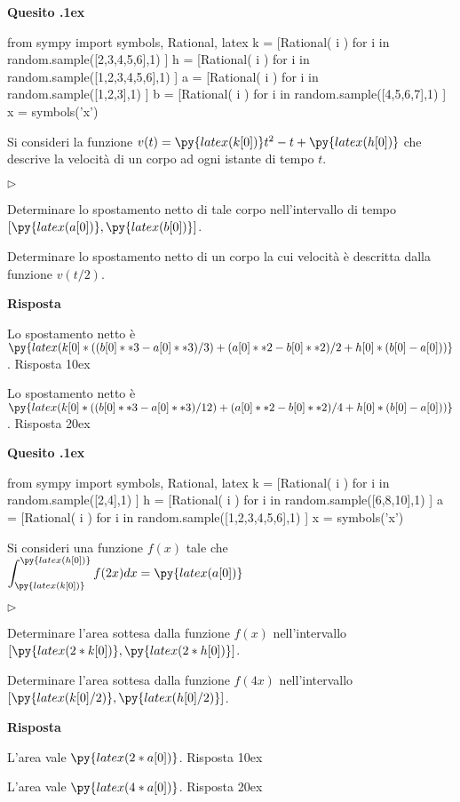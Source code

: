 \documentclass[11pt,twoside,a4paper]{article}
\newcommand{\mylabel}[1]{#1\hfill}
\renewenvironment{itemize}
  {\begin{list}{$\triangleright$}{%
   \setlength{\parskip}{0mm}
   \setlength{\topsep}{.4\baselineskip}
   \setlength{\rightmargin}{0mm}
   \setlength{\listparindent}{0mm}
   \setlength{\itemindent}{0mm}
   \setlength{\labelwidth}{2ex}
   \setlength{\itemsep}{.4\baselineskip}
   \setlength{\parsep}{0mm}
   \setlength{\partopsep}{0mm}
   \setlength{\labelsep}{1ex}
   \setlength{\leftmargin}{\labelwidth+\labelsep}
   \let\makelabel\mylabel}}{%
   \end{list}\vspace*{-1.3mm}}
\newcounter{quesito}
\newenvironment{question}{\bigskip\addtocounter{quesito}{1}\bigskip\bigskip\par\textbf{Quesito \thequesito.\kern1ex}}{\vspace{\parskip}}
\newenvironment{answer}{\par\textbf{Risposta\quad}}{\vspace{\parskip}}
\begin{document}
\begin{question}
\begin{pycode}
from sympy import symbols, Rational, latex
k = [Rational( i ) for i in random.sample([2,3,4,5,6],1) ]
h = [Rational( i ) for i in random.sample([1,2,3,4,5,6],1) ]
a = [Rational( i ) for i in random.sample([1,2,3],1) ]
b = [Rational( i ) for i in random.sample([4,5,6,7],1) ]
x = symbols('x')
\end{pycode}
Si consideri la funzione $v(t) = \py{latex(k[0])} t^2 - t +\py{latex(h[0])}$ che descrive la velocit\`a di un corpo ad ogni istante di tempo $t$.
\begin{itemize}
\item[1.] Determinare lo spostamento netto di tale corpo nell'intervallo di tempo $[\py{latex(a[0])}, \py{latex(b[0])}]$.
\item[2.] Determinare lo spostamento netto di un corpo la cui velocit\`a \`e descritta dalla funzione $v(t/2)$.
\end{itemize}
\begin{answer}

{\color{blue} Lo spostamento netto è $\displaystyle\py{latex(k[0]*((b[0]**3-a[0]**3)/3)+(a[0]**2-b[0]**2)/2+h[0]*(b[0]-a[0]))}$. 
\hfill Risposta 1\kern0ex}

\medskip
{\color{blue} Lo spostamento netto è $\displaystyle\py{latex(k[0]*((b[0]**3-a[0]**3)/12)+(a[0]**2-b[0]**2)/4+h[0]*(b[0]-a[0]))}$.
\hfill Risposta 2\kern0ex}

\end{answer}
\end{question}
\begin{question}
\begin{pycode}
from sympy import symbols, Rational, latex
k = [Rational( i ) for i in random.sample([2,4],1) ]
h = [Rational( i ) for i in random.sample([6,8,10],1) ]
a = [Rational( i ) for i in random.sample([1,2,3,4,5,6],1) ]
x = symbols('x')
\end{pycode}
Si consideri una funzione $f(x)$ tale che $\displaystyle \int_{\py{latex(k[0])}}^{\py{latex(h[0])}} f(2x) dx = \py{latex(a[0])}$
\begin{itemize}
\item[1.] Determinare l'area sottesa dalla funzione $f(x)$ nell'intervallo $[\py{latex(2*k[0])},\py{latex(2*h[0])}]$.
\item[2.] Determinare l'area sottesa dalla funzione $f(4x)$ nell'intervallo $[\py{latex(k[0]/2)},\py{latex(h[0]/2)}]$.
\end{itemize}
\begin{answer}

{\color{blue} L'area vale $\py{latex(2*a[0])}$. 
\hfill Risposta 1\kern0ex}


\medskip
{\color{blue}L'area vale $\py{latex(4*a[0])}$.
\hfill Risposta 2\kern0ex}

\end{answer}
\end{question}
\end{document}
